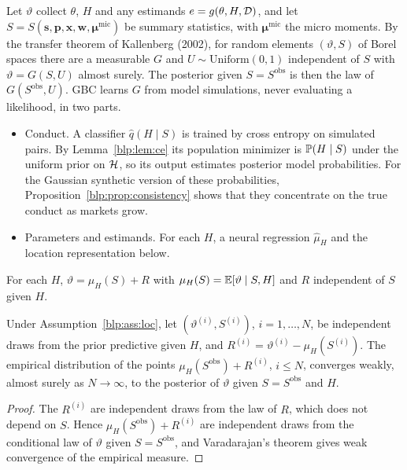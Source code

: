 Let $\vartheta$ collect $\theta$, $H$ and any estimands $e = g(\theta,H,\mathcal{D})$, and let
$S = S(\bm s,\bm p,\bm x,\bm w,\bm\mu^{\mathrm{mic}})$ be summary statistics, with $\bm\mu^{\mathrm{mic}}$ the micro moments. By
the transfer theorem of Kallenberg (2002), for random elements $(\vartheta,S)$ of Borel spaces
there are a measurable $G$ and $U\sim\mathrm{Uniform}(0,1)$ independent of $S$ with
$\vartheta = G(S,U)$ almost surely. The posterior given $S=S^{\mathrm{obs}}$ is then the law of
$G(S^{\mathrm{obs}},U)$. GBC learns $G$ from model simulations, never evaluating a likelihood, in two parts.

\begin{itemize}
\item Conduct. A classifier $\hat q(H\mid S)$ is trained by cross entropy on simulated pairs. By
Lemma~\ref{blp:lem:ce} its population minimizer is $\mathbb{P}(H\mid S)$ under the uniform prior on $\mathcal{H}$, so its output estimates posterior model probabilities. For the Gaussian synthetic version of these probabilities, Proposition~\ref{blp:prop:consistency} shows that they concentrate on the true conduct as markets grow.
\item Parameters and estimands. For each $H$, a neural regression $\hat\mu_H$ and the location
representation below.
\end{itemize}

\begin{assumption}\label{blp:ass:loc}
For each $H$, $\vartheta = \mu_H(S) + R$ with $\mu_H(S) = \mathbb{E}[\vartheta\mid S,H]$ and $R$
independent of $S$ given $H$.
\end{assumption}

\begin{proposition}\label{blp:prop:abc}
Under Assumption~\ref{blp:ass:loc}, let $(\vartheta^{(i)},S^{(i)})$, $i=1,\dots,N$, be independent
draws from the prior predictive given $H$, and $R^{(i)} = \vartheta^{(i)} - \mu_H(S^{(i)})$. The
empirical distribution of the points $\mu_H(S^{\mathrm{obs}}) + R^{(i)}$, $i\le N$, converges
weakly, almost surely as $N \to \infty$, to the posterior of $\vartheta$ given $S = S^{\mathrm{obs}}$ and $H$.
\end{proposition}
\begin{proof}
The $R^{(i)}$ are independent draws from the law of $R$, which does not depend on $S$. Hence
$\mu_H(S^{\mathrm{obs}}) + R^{(i)}$ are independent draws from the conditional law of $\vartheta$
given $S = S^{\mathrm{obs}}$, and Varadarajan's theorem gives weak convergence of the empirical
measure.
\end{proof}

